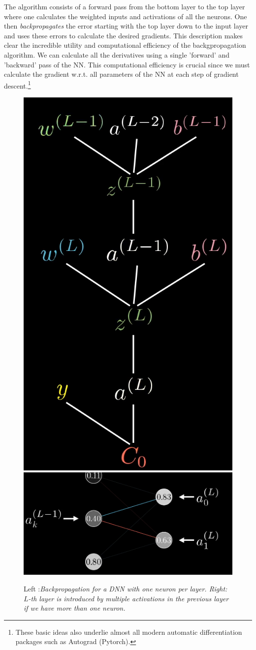 The algorithm consists of a forward pass from the bottom layer to the top layer where one calculates the weighted inputs and activations of all the neurons. One then \emph{backpropagates} the error starting with the top layer down to the input layer and uses these errors to calculate the desired gradients. This description makes clear the incredible utility and computational efficiency of the backgpropagation algorithm. We can calculate all the derivatives using a single ’forward’ and ’backward’ pass of the NN. This computational efficiency is crucial since we must calculate the gradient w.r.t. all parameters of the NN at each step of gradient descent.\footnote{These basic ideas also underlie almost all modern automatic differentiation packages such as Autograd (Pytorch).}\\
\begin{figure}[h!]
	\centering
	\includegraphics[width=0.3\linewidth]{gfx/Backpropagation}
	\includegraphics[width=0.6\linewidth]{gfx/Backpropagation2}
	\caption{Left :\itshape Backpropagation for a DNN with one neuron per layer. \normalfont Right: \itshape $L$-th layer is introduced by multiple activations in the previous layer if we have more than one neuron.}
	\label{fig:backpropagation}
\end{figure}
